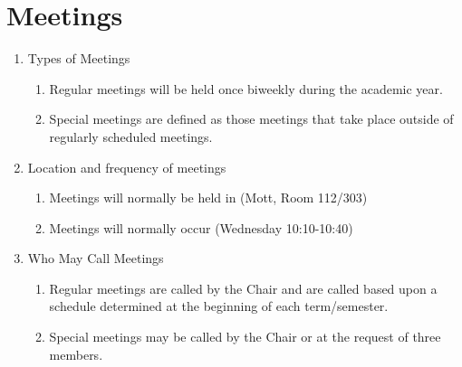 \documentclass[letterpaper, 12pt]{article}
\begin{document}
\section{Meetings}
\begin{enumerate} 
    \item Types of Meetings
        \begin{enumerate}
            \item Regular meetings will be held once biweekly during the 
                academic year.
            \item Special meetings are defined as those meetings that take 
                place outside of regularly scheduled meetings.  
        \end{enumerate}
    \item Location and frequency of meetings
        \begin{enumerate}
            \item Meetings will normally be held in (Mott, Room 112/303)
            \item Meetings will normally occur (Wednesday 10:10-10:40)
        \end{enumerate}
    \item Who May Call Meetings
        \begin{enumerate}
            \item Regular meetings are called by the Chair and are called 
                based upon a schedule determined at the beginning of each 
                term/semester.
            \item Special meetings may be called by the Chair or at the 
                request of three members.
        \end{enumerate}
\end{enumerate}
\end{document}
